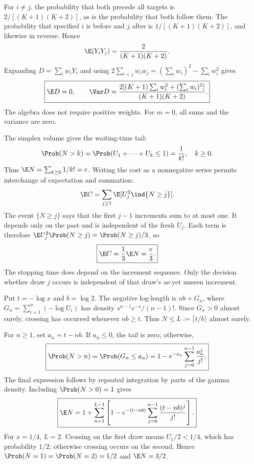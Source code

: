 For $i\ne j$, the probability that both precede all targets is $2/[(K+1)(K+2)]$, as is the probability that both follow them. The probability that specified $i$ is before and $j$ after is $1/[(K+1)(K+2)]$, and likewise in reverse. Hence
\[
\E(Y_iY_j)=\frac2{(K+1)(K+2)}.
\]
Expanding $D=\sum_iw_iY_i$ and using $2\sum_{i<j}w_iw_j=(\sum_iw_i)^2-\sum_iw_i^2$ gives
\[
\boxed{\E D=0,\qquad
\Var D=\frac{2[(K+1)\sum_iw_i^2+(\sum_iw_i)^2]}{(K+1)(K+2)}.}
\]
The algebra does not require positive weights. For $m=0$, all sums and the variance are zero.

The simplex volume gives the waiting-time tail:
\[
\Prob(N>k)=\Prob(U_1+\cdots+U_k\le1)=\frac1{k!},\quad k\ge0.
\]
Thus $\E N=\sum_{k\ge0}1/k!=e$. Writing the cost as a nonnegative series permits interchange of expectation and summation:
\[
\E C=\sum_{j\ge1}\E[U_j^2\ind\{N\ge j\}].
\]
The event $\{N\ge j\}$ says that the first $j-1$ increments sum to at most one. It depends only on the past and is independent of the fresh $U_j$. Each term is therefore $\E U_j^2\Prob(N\ge j)=\Prob(N\ge j)/3$, so
\[
\boxed{\E C=\frac13\E N=\frac e3.}
\]
The stopping time does depend on the increment sequence. Only the decision whether draw $j$ occurs is independent of that draw's as-yet unseen increment.

Put $t=-\log x$ and $b=\log2$. The negative log-length is $nb+G_n$, where $G_n=\sum_{i=1}^n(-\log U_i)$ has density $s^{n-1}e^{-s}/(n-1)!$. Since $G_n>0$ almost surely, crossing has occurred whenever $nb\ge t$. Thus $N\le L:=\lceil t/b\rceil$ almost surely.

For $n\ge1$, set $a_n=t-nb$. If $a_n\le0$, the tail is zero; otherwise,
\[
\boxed{\Prob(N>n)=\Prob(G_n\le a_n)
=1-e^{-a_n}\sum_{j=0}^{n-1}\frac{a_n^j}{j!}.}
\]
The final expression follows by repeated integration by parts of the gamma density. Including $\Prob(N>0)=1$ gives
\[
\boxed{\E N=1+\sum_{n=1}^{L-1}
\left[1-e^{-(t-nb)}\sum_{j=0}^{n-1}\frac{(t-nb)^j}{j!}\right].}
\]
For $x=1/4$, $L=2$. Crossing on the first draw means $U_1/2<1/4$, which has probability $1/2$; otherwise crossing occurs on the second. Hence $\Prob(N=1)=\Prob(N=2)=1/2$ and $\E N=3/2$.

